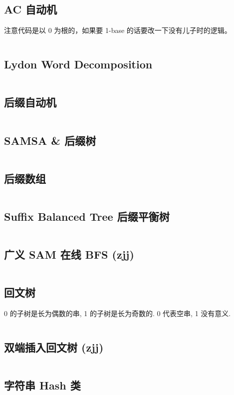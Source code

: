 \documentclass[titlepage, a4paper]{article}
\begin{document}
\begin{multicols}{2}
\begin{spacing}{0.6}
				\subsection{AC 自动机}
					注意代码是以 0 为根的，如果要 1-base 的话要改一下没有儿子时的逻辑。
					\inputminted{cpp}{src/String/AC 自动机.cpp}
				\subsection{Lydon Word Decomposition}
					\inputminted{cpp}{src/String/Lyndon Word.cpp}
				\subsection{后缀自动机}
					\inputminted{cpp}{src/String/SAM.cpp}
				\subsection{SAMSA \& 后缀树}
					\inputminted{cpp}{src/String/SAMSA.cpp}
				\subsection{后缀数组}
					\inputminted{cpp}{src/String/SA.cpp}
				\subsection{Suffix Balanced Tree 后缀平衡树}
					\inputminted{cpp}{src/String/后缀平衡树.cpp}
				\subsection{广义 SAM 在线 BFS (zjj)}
				\inputminted{cpp}{src/String/generalizedSAM.cpp}
				\subsection{回文树}
					0 的子树是长为偶数的串, 1 的子树是长为奇数的. 0 代表空串, 1 没有意义.
					\inputminted{cpp}{src/String/PAM.cpp}
				\subsection{双端插入回文树 (zjj)}
				\inputminted{cpp}{src/String/PAM_bidirectional.cpp}
				\subsection{字符串 Hash 类}
				\texttt{}
				\inputminted{cpp}{src/String/hash.cpp}	

\end{spacing}
\end{multicols}
\end{document}
